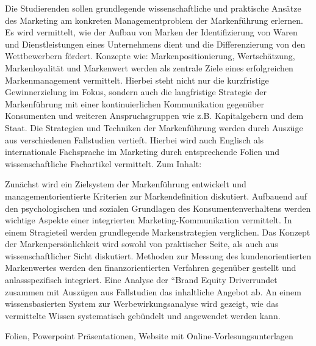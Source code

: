 \begin{course}
\begin{content}
Die Studierenden sollen grundlegende wissenschaftliche und praktische Ansätze des Marketing am konkreten Managementproblem der Markenführung erlernen. Es wird vermittelt, wie der Aufbau von Marken der Identifizierung von Waren und Dienstleistungen eines Unternehmens dient und die Differenzierung von den Wettbewerbern fördert. Konzepte wie: Markenpositionierung, Wertschätzung, Markenloyalität und Markenwert werden als zentrale Ziele eines erfolgreichen Markenmanagement vermittelt. Hierbei steht nicht nur die kurzfristige Gewinnerzielung im Fokus, sondern auch die langfristige Strategie der Markenführung mit einer kontinuierlichen Kommunikation gegenüber Konsumenten und weiteren Anspruchsgruppen wie z.B. Kapitalgebern und dem Staat. Die Strategien und Techniken der Markenführung werden durch Auszüge aus verschiedenen Fallstudien vertieft. Hierbei wird auch Englisch als internationale Fachsprache im Marketing durch entsprechende Folien und wissenschaftliche Fachartikel vermittelt. Zum Inhalt:

 

Zunächst wird ein Zielsystem der Markenführung entwickelt und managementorientierte Kriterien zur Markendefinition diskutiert. Aufbauend auf den psychologischen und sozialen Grundlagen des Konsumentenverhaltens werden wichtige Aspekte einer integrierten Marketing-Kommunikation vermittelt. In einem Stragieteil werden grundlegende Markenstrategien verglichen. Das Konzept der Markenpersönlichkeit wird sowohl von praktischer Seite, als auch aus wissenschaftlicher Sicht diskutiert. Methoden zur Messung des kundenorientierten Markenwertes werden den finanzorientierten Verfahren gegenüber gestellt und anlassspezifisch integriert. Eine Analyse der “Brand Equity Driverrundet zusammen mit Auszügen aus Fallstudien das inhaltliche Angebot ab. An einem wissensbasierten System zur Werbewirkungsanalyse wird gezeigt, wie das vermittelte Wissen systematisch gebündelt und angewendet werden kann.


\end{content}

\begin{media}Folien, Powerpoint Präsentationen, Website mit Online-Vorlesungsunterlagen

\end{media}


\end{course}
